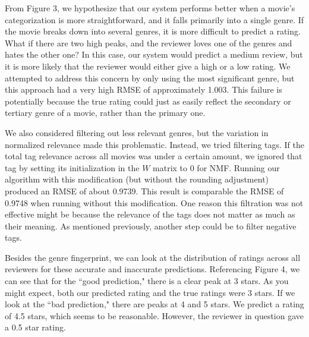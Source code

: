 \documentclass[letterpaper, 10 pt, conference]{ieeeconf}  %
\begin{document}
From Figure 3, we hypothesize that our system performs better when a movie's categorization is more straightforward, and it falls primarily into a single genre. If the movie breaks down into several genres, it is more difficult to predict a rating. What if there are two high peaks, and the reviewer loves one of the genres and hates the other one? In this case, our system would predict a medium review, but it is more likely that the reviewer would either give a high or a low rating. We attempted to address this concern by only using the most significant genre, but this approach had a very high RMSE of approximately 1.003. This failure is potentially because the true rating could just as easily reflect the secondary or tertiary genre of a movie, rather than the primary one.

We also considered filtering out less relevant genres, but the variation in normalized relevance made this problematic. Instead, we tried filtering tags. If the total tag relevance across all movies was under a certain amount, we ignored that tag by setting its initialization in the $W$ matrix to 0 for NMF. Running our algorithm with this modification (but without the rounding adjustment) produced an RMSE of about 0.9739. This result is comparable the RMSE of 0.9748 when running without this modification. One reason this filtration was not effective might be because the relevance of the tags does not matter as much as their meaning. As mentioned previously, another step could be to filter negative tags.

Besides the genre fingerprint, we can look at the distribution of ratings across all reviewers for these accurate and inaccurate predictions. Referencing Figure 4, we can see that for the ``good prediction," there is a clear peak at 3 stars. As you might expect, both our predicted rating and the true ratings were 3 stars. If we look at the ``bad prediction," there are peaks at 4 and 5 stars. We predict a rating of 4.5 stars, which seems to be reasonable. However, the reviewer in question gave a 0.5 star rating.
\end{document}
